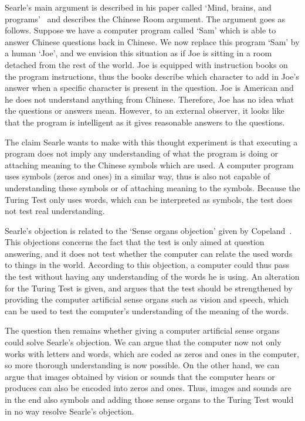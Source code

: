 Searle’s main argument is described in his paper called ‘Mind, brains, and programs’~\cite{searle1980minds} and describes the Chinese Room argument. The argument goes as follows. Suppose we have a computer program called ‘Sam’ which is able to answer Chinese questions back in Chinese. We now replace this program ‘Sam’ by a human ‘Joe’, and we envision this situation as if Joe is sitting in a room detached from the rest of the world. Joe is equipped with instruction books on the program instructions, thus the books describe which character to add in Joe’s answer when a specific character is present in the question. Joe is American and he does not understand anything from Chinese. Therefore, Joe has no idea what the questions or answers mean. However, to an external observer, it looks like that the program is intelligent as it gives reasonable answers to the questions.

The claim Searle wants to make with this thought experiment is that executing a program does not imply any understanding of what the program is doing or attaching meaning to the Chinese symbols which are used. A computer program uses symbols (zeros and ones) in a similar way, thus is also not capable of understanding these symbols or of attaching meaning to the symbols. Because the Turing Test only uses words, which can be interpreted as symbols, the test does not test real understanding.

Searle’s objection is related to the ‘Sense organs objection’ given by Copeland~\cite{copeland2015artificial}. This objections concerns the fact that the test is only aimed at question answering, and it does not test whether the computer can relate the used words to things in the world. According to this objection, a computer could thus pass the test without having any understanding of the words he is using. An alteration for the Turing Test is given, and argues that the test should be strengthened by providing the computer artificial sense organs such as vision and speech, which can be used to test the computer’s understanding of the meaning of the words.

The question then remains whether giving a computer artificial sense organs could solve Searle’s objection. We can argue that the computer now not only works with letters and words, which are coded as zeros and ones in the computer, so more thorough understanding is now possible. On the other hand, we can argue that images obtained by vision or sounds that the computer hears or produces can also be encoded into zeros and ones. Thus, images and sounds are in the end also symbols and adding those sense organs to the Turing Test would in no way resolve Searle’s objection.

